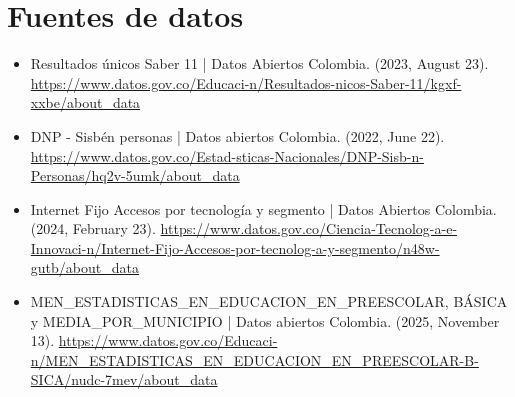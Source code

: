 \section*{Fuentes de datos}

\begin{sloppypar}
\begin{itemize}
    \item Resultados únicos Saber 11 | Datos Abiertos Colombia. (2023, August 23). \url{https://www.datos.gov.co/Educaci-n/Resultados-nicos-Saber-11/kgxf-xxbe/about\_data}
    \item DNP - Sisbén personas | Datos abiertos Colombia. (2022, June 22). \url{https://www.datos.gov.co/Estad-sticas-Nacionales/DNP-Sisb-n-Personas/hq2v-5umk/about\_data}
    \item Internet Fijo Accesos por tecnología y segmento | Datos Abiertos Colombia. (2024, February 23). \url{https://www.datos.gov.co/Ciencia-Tecnolog-a-e-Innovaci-n/Internet-Fijo-Accesos-por-tecnolog-a-y-segmento/n48w-gutb/about\_data}
    \item MEN\_\allowbreak ESTADISTICAS\_\allowbreak EN\_\allowbreak EDUCACION\_\allowbreak EN\_\allowbreak PREESCOLAR, BÁSICA y MEDIA\_\allowbreak POR\_\allowbreak MUNICIPIO | Datos abiertos Colombia. (2025, November 13). \url{https://www.datos.gov.co/Educaci-n/MEN\_ESTADISTICAS\_EN\_EDUCACION\_EN\_PREESCOLAR-B-SICA/nudc-7mev/about\_data}
\end{itemize}
\end{sloppypar}